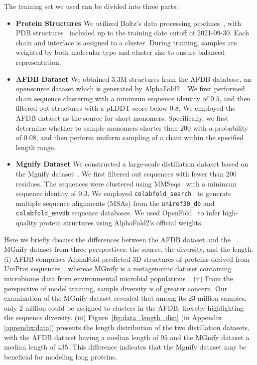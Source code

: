 \documentclass[]{bytedance_seed}
\begin{document}
The training set we used can be divided into three parts: 
\begin{itemize}
    \item \textbf{Protein Structures} We utilized Boltz's data processing pipelines~\cite{passaro2025boltz}, with PDB structures~\cite{berman2000protein} included up to the training date cutoff of 2021-09-30. Each chain and interface is assigned to a cluster. During training, samples are weighted by both molecular type and cluster size to ensure balanced representation.
    \item \textbf{AFDB Dataset} We obtained $3.3$M structures from the AFDB database, an opensource dataset which is generated by AlphaFold2~\cite{varadi2022alphafold}. We first performed chain sequence clustering with a minimum sequence identity of $0.5$, and then filtered out structures with a pLDDT score below $0.8$. We employed the AFDB dataset as the source for short monomers. Specifically, we first determine whether to sample monomers shorter than $200$ with a probability of $0.08$, and then perform uniform sampling of a chain within the specified length range.
    \item \textbf{Mgnify Dataset} We constructed a large-scale distillation dataset based on the Mgnify dataset~\cite{mitchell2020mgnify,evans2021protein}. We first filtered out sequences with fewer than $200$ residues. The sequences were clustered using MMSeqs~\cite{steinegger2017mmseqs2} with a minimum sequence identity of $0.3$. We employed \texttt{colabfold\_search}~\cite{mirdita2022colabfold} to generate multiple sequence alignments (MSAs) from the \texttt{uniref30\_db} and \texttt{colabfold\_envdb} sequence databases. We used OpenFold~\cite{ahdritz2024openfold} to infer high-quality protein structures using AlphaFold2's official weights. %
\end{itemize}




Here we briefly discuss the differences between the AFDB dataset and the MGnify dataset from three perspectives: the source, the diversity, and the length. (i) AFDB comprises AlphaFold-predicted 3D structures of proteins derived from UniProt sequences~\cite{uniprot2019uniprot}, whereas MGnify is a metagenomic dataset containing microbiome data from environmental microbial populations~\cite{mitchell2020mgnify}. (ii) From the perspective of model training, sample diversity is of greater concern. Our examination of the MGnify dataset revealed that among its $23$ million samples, only $2$ million could be assigned to clusters in the AFDB, thereby highlighting the sequence diversity. (iii) Figure~\ref{fig:data_length_dist} (in Appendix \ref{appendix:data}) presents the length distribution of the two distillation datasets, with the AFDB dataset having a median length of $95$ and the MGnify dataset a median length of $435$. This difference indicates that the Mgnify dataset may be beneficial for modeling long proteins.
\end{document}
